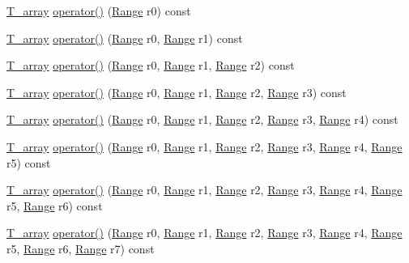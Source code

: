 \begin{DoxyCompactItemize}
\item 
\hyperlink{classArray_a6a3d9b6a214107a10df219091801f1e0}{T\+\_\+array} \hyperlink{classArray_a237833cefd0a253ddcf810cb5ae8ceba}{operator()} (\hyperlink{classRange}{Range} r0) const 
\item 
\hyperlink{classArray_a6a3d9b6a214107a10df219091801f1e0}{T\+\_\+array} \hyperlink{classArray_a2fd0c5a123d22ffa5f0bd7ac3e9f01c4}{operator()} (\hyperlink{classRange}{Range} r0, \hyperlink{classRange}{Range} r1) const 
\item 
\hyperlink{classArray_a6a3d9b6a214107a10df219091801f1e0}{T\+\_\+array} \hyperlink{classArray_a5133307661f35b6a567dd26c3b6af85e}{operator()} (\hyperlink{classRange}{Range} r0, \hyperlink{classRange}{Range} r1, \hyperlink{classRange}{Range} r2) const 
\item 
\hyperlink{classArray_a6a3d9b6a214107a10df219091801f1e0}{T\+\_\+array} \hyperlink{classArray_a5da3752af4bbc20607168da1eca63f8b}{operator()} (\hyperlink{classRange}{Range} r0, \hyperlink{classRange}{Range} r1, \hyperlink{classRange}{Range} r2, \hyperlink{classRange}{Range} r3) const 
\item 
\hyperlink{classArray_a6a3d9b6a214107a10df219091801f1e0}{T\+\_\+array} \hyperlink{classArray_aca7b645f641c603fb6eb81a92f34d92c}{operator()} (\hyperlink{classRange}{Range} r0, \hyperlink{classRange}{Range} r1, \hyperlink{classRange}{Range} r2, \hyperlink{classRange}{Range} r3, \hyperlink{classRange}{Range} r4) const 
\item 
\hyperlink{classArray_a6a3d9b6a214107a10df219091801f1e0}{T\+\_\+array} \hyperlink{classArray_a0b8a10b82d1d05320e5838be4161950c}{operator()} (\hyperlink{classRange}{Range} r0, \hyperlink{classRange}{Range} r1, \hyperlink{classRange}{Range} r2, \hyperlink{classRange}{Range} r3, \hyperlink{classRange}{Range} r4, \hyperlink{classRange}{Range} r5) const 
\item 
\hyperlink{classArray_a6a3d9b6a214107a10df219091801f1e0}{T\+\_\+array} \hyperlink{classArray_ac994507c928299f379694fd3ce091c1d}{operator()} (\hyperlink{classRange}{Range} r0, \hyperlink{classRange}{Range} r1, \hyperlink{classRange}{Range} r2, \hyperlink{classRange}{Range} r3, \hyperlink{classRange}{Range} r4, \hyperlink{classRange}{Range} r5, \hyperlink{classRange}{Range} r6) const 
\item 
\hyperlink{classArray_a6a3d9b6a214107a10df219091801f1e0}{T\+\_\+array} \hyperlink{classArray_aa6d69693d4935f73677aa78d4036f473}{operator()} (\hyperlink{classRange}{Range} r0, \hyperlink{classRange}{Range} r1, \hyperlink{classRange}{Range} r2, \hyperlink{classRange}{Range} r3, \hyperlink{classRange}{Range} r4, \hyperlink{classRange}{Range} r5, \hyperlink{classRange}{Range} r6, \hyperlink{classRange}{Range} r7) const 

\end{DoxyCompactItemize}

